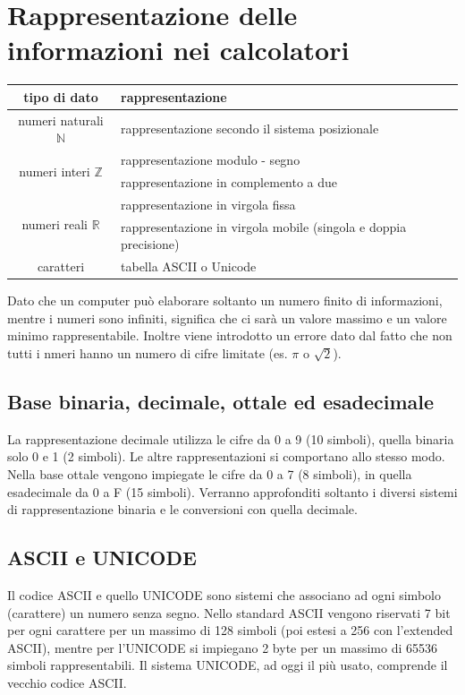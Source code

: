 \documentclass[a4paper]{article}
\begin{document}
\section{Rappresentazione delle informazioni nei calcolatori}
\begin{center}
	\begin{tabularx}{\textwidth}{c X}
		\textbf{tipo di dato} & \textbf{rappresentazione} \\
		\toprule
		numeri naturali \(\mathbb{N}\) & rappresentazione secondo il sistema posizionale \\
		\midrule
		\multirow{2}{*}{numeri interi \(\mathbb{Z}\)} & rappresentazione modulo - segno \\
		& rappresentazione in complemento a due \\
		\midrule
		\multirow{2}{*}{numeri reali \(\mathbb{R}\)} & rappresentazione in virgola fissa \\
		& rappresentazione in virgola mobile (singola e doppia precisione) \\
		\midrule
		caratteri & tabella ASCII o Unicode
	\end{tabularx}
\end{center}

Dato che un computer può elaborare soltanto un numero finito di informazioni, mentre i numeri sono infiniti, significa che
ci sarà un valore massimo e un valore minimo rappresentabile. Inoltre viene introdotto un errore dato dal fatto che non tutti
i nmeri hanno un numero di cifre limitate (es. \(\pi\) o \(\sqrt{2}\)).

\subsection{Base binaria, decimale, ottale ed esadecimale}
La rappresentazione decimale utilizza le cifre da 0 a 9 (10 simboli), quella binaria solo 0 e 1 (2 simboli). Le altre
rappresentazioni si comportano allo stesso modo. Nella base ottale vengono impiegate le cifre da 0 a 7 (8 simboli),
in quella esadecimale da 0 a F (15 simboli). Verranno approfonditi soltanto i diversi sistemi di rappresentazione
binaria e le conversioni con quella decimale.

\subsection{ASCII e UNICODE}
Il codice ASCII e quello UNICODE sono sistemi che associano ad ogni simbolo (carattere) un numero senza segno. Nello standard
ASCII vengono riservati 7 bit per ogni carattere per un massimo di 128 simboli (poi estesi a 256 con l'extended ASCII), mentre
per l'UNICODE si impiegano 2 byte per un massimo di 65536 simboli rappresentabili. Il sistema UNICODE, ad oggi il più usato,
comprende il vecchio codice ASCII.
\end{document}
